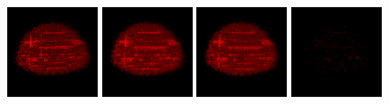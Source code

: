 \begin{figure}[!htb]
  \centering  
  \includegraphics[height=100px]{images/graphics/overdraw-hairball1-nocull.png}
  \includegraphics[height=100px]{images/graphics/overdraw-hairball1-pooc.png}
  \includegraphics[height=100px]{images/graphics/overdraw-hairball1-pmoc.png}
  \includegraphics[height=100px]{images/graphics/overdraw-hairball1-diff.png}


\end{figure}
